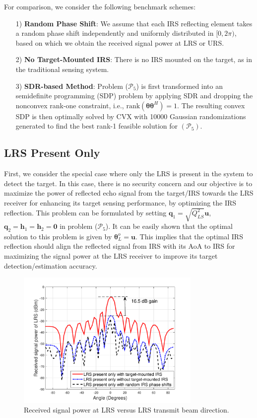 \documentclass[10pt,final,doublecolumn]{IEEEtran}
\begin{document}
For comparison, we consider the following benchmark
schemes:
\begin{itemize}
    \item [1)] {\bf  Random Phase Shift}: We assume that each IRS reflecting
element takes a random phase shift independently
and uniformly distributed in $[0,2\pi)$, based on which we
obtain the received signal power at LRS or URS.

    \item [2)] {\bf No Target-Mounted IRS}: There is no IRS mounted
on the target, as in the traditional sensing system.

    \item [3)] {\bf SDR-based Method}: Problem ($\mathcal{P}_5$) is first  transformed into an semidefinite programming (SDP) problem by applying SDR and dropping the nonconvex rank-one constraint, i.e., $\mathrm{rank}(\boldsymbol{\theta}\boldsymbol{\theta}^H)=1$.
The resulting convex SDP is then optimally solved by CVX \cite{sdr} with 10000 Gaussian randomizations generated to find the best rank-1 feasible solution for $(\mathcal{P}_5)$.
\end{itemize}

\subsection{LRS Present Only }
First, we consider the special case where only the LRS is present in the system to detect the target. In this case, there is no security concern and our objective is to maximize the power of reflected echo signal from the target/IRS towards the LRS receiver for enhancing its target sensing performance, by optimizing the IRS reflection. This problem can be formulated  by setting $\mathbf{q}_1=\sqrt{{{Q_{LS}^2}}}\mathbf{u}$, $\mathbf{q}_2=\mathbf{h}_1=\mathbf{h}_2=\mathbf{0}$ in problem ($\mathcal{P}_5$).
It can be easily shown that the optimal solution to this problem is given by $\boldsymbol{\theta}_{L}^o=\mathbf{u}$. This implies that the optimal IRS reflection should align the reflected signal from IRS with its AoA to IRS for maximizing the signal power at the LRS receiver to
improve its target detection/estimation accuracy.
\begin{figure}[t]
\centering
\setlength{\abovecaptionskip}{0.cm}
\includegraphics[width=3.5in]{NSR_BEAM.pdf}
\caption{Received signal power at LRS versus LRS transmit beam direction.}
\label{NSR_BEAM}
\end{figure}
\end{document}
